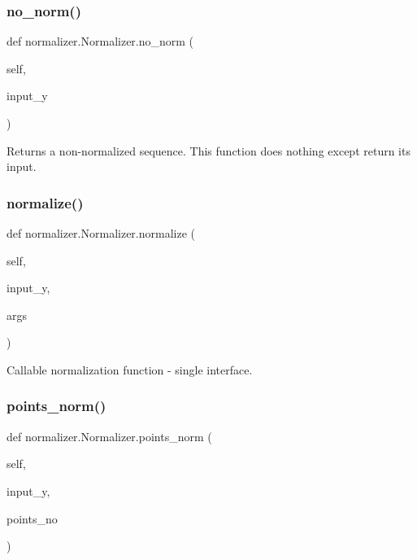 \subsubsection{\texorpdfstring{no\+\_\+norm()}{no\_norm()}}
{\footnotesize\ttfamily def normalizer.\+Normalizer.\+no\+\_\+norm (\begin{DoxyParamCaption}\item[{}]{self,  }\item[{}]{input\+\_\+y }\end{DoxyParamCaption})}

\begin{DoxyVerb}Returns a non-normalized sequence. This function does nothing except return its input.
\end{DoxyVerb}
 \mbox{\label{classnormalizer_1_1Normalizer_acae7ff724a12ef29c97f6eb2d30f5d62}} 
\subsubsection{\texorpdfstring{normalize()}{normalize()}}
{\footnotesize\ttfamily def normalizer.\+Normalizer.\+normalize (\begin{DoxyParamCaption}\item[{}]{self,  }\item[{}]{input\+\_\+y,  }\item[{}]{args }\end{DoxyParamCaption})}

\begin{DoxyVerb}Callable normalization function - single interface.
\end{DoxyVerb}
 \mbox{\label{classnormalizer_1_1Normalizer_a44aea90aa5ab90fbc6cc617acdc589c5}} 
\subsubsection{\texorpdfstring{points\+\_\+norm()}{points\_norm()}}
{\footnotesize\ttfamily def normalizer.\+Normalizer.\+points\+\_\+norm (\begin{DoxyParamCaption}\item[{}]{self,  }\item[{}]{input\+\_\+y,  }\item[{}]{points\+\_\+no }\end{DoxyParamCaption})}

